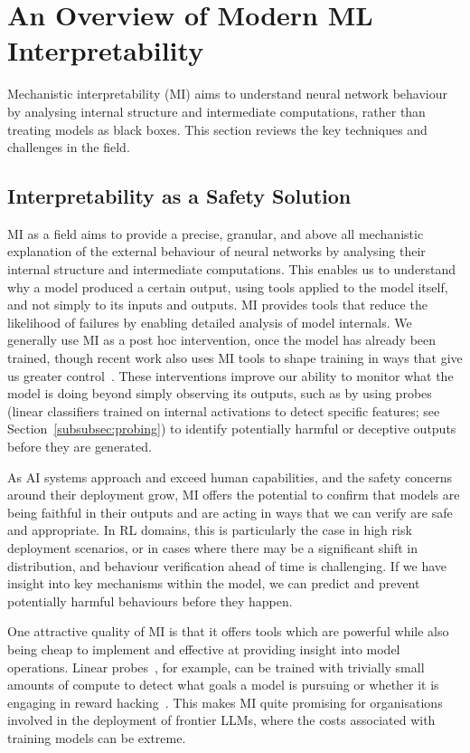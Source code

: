 \section{An Overview of Modern ML Interpretability}\label{sec:interpretability}
Mechanistic interpretability (MI) aims to understand neural network behaviour by analysing internal structure and intermediate computations, rather than treating models as black boxes. This section reviews the key techniques and challenges in the field.

\subsection{Interpretability as a Safety Solution}\label{subsec:interp_for_safety}
MI as a field aims to provide a precise, granular, and above all mechanistic explanation of the external behaviour of neural networks by analysing their internal structure and intermediate computations. This enables us to understand why a model produced a certain output, using tools applied to the model itself, and not simply to its inputs and outputs. MI provides tools that reduce the likelihood of failures by enabling detailed analysis of model internals. We generally use MI as a post hoc intervention, once the model has already been trained, though recent work also uses MI tools to shape training in ways that give us greater control~\citep{casademunt_2025_steering}. These interventions improve our ability to monitor what the model is doing beyond simply observing its outputs, such as by using probes (linear classifiers trained on internal activations to detect specific features; see Section~\ref{subsubsec:probing}) to identify potentially harmful or deceptive outputs before they are generated.

As AI systems approach and exceed human capabilities, and the safety concerns around their deployment grow, MI offers the potential to confirm that models are being faithful in their outputs and are acting in ways that we can verify are safe and appropriate. In RL domains, this is particularly the case in high risk deployment scenarios, or in cases where there may be a significant shift in distribution, and behaviour verification ahead of time is challenging. If we have insight into key mechanisms within the model, we can predict and prevent potentially harmful behaviours before they happen.

One attractive quality of MI is that it offers tools which are powerful while also being cheap to implement and effective at providing insight into model operations. Linear probes~\citep{alain_2018_understanding}, for example, can be trained with trivially small amounts of compute to detect what goals a model is pursuing or whether it is engaging in reward hacking~\citep{shihab_2025_detecting}. This makes MI quite promising for organisations involved in the deployment of frontier LLMs, where the costs associated with training models can be extreme.

